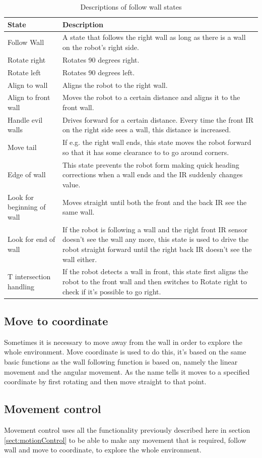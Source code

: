 \begin{table}[h!]
\centering
  \caption{Descriptions of follow wall states}
  \begin{tabular}{l|p{10cm}}
    \textbf{State} & \textbf{Description} \\ \hline
    Follow Wall & A state that follows the right wall as long as there is a wall on the robot’s right side. \\ \hline
    Rotate right & Rotates 90 degrees right. \\ \hline
    Rotate left & Rotates 90 degrees left. \\ \hline
    Align to wall & Aligns the robot to the right wall. \\ \hline
    Align to front wall & Moves the robot to a certain distance and aligns it to the front wall. \\ \hline
    Handle evil walls & Drives forward for a certain distance. Every time the front IR on the right side sees a wall, this distance is increased. \\ \hline
    Move tail & If e.g. the right wall ends, this state moves the robot forward so that it has some clearance to to go around corners. \\ \hline
    Edge of wall & This state prevents the robot form making quick heading corrections when a wall ends and the IR suddenly changes value. \\ \hline
    Look for beginning of wall & Moves straight until both the front and the back IR see the same wall.  \\ \hline
    Look for end of wall & If the robot is following a wall and the right front IR sensor doesn’t see the wall any more, this state is used to drive the robot straight forward until the right back IR doesn’t see the wall either. \\ \hline
    T intersection handling & If the robot detects a wall in front, this state first aligns the robot to the front wall and then switches to Rotate right to check if it’s possible to go right. \\ 
    \hline
  \end{tabular}
\normalsize
\label{tab:followWallStates}
\end{table}

\subsection{Move to coordinate}
Sometimes it is necessary to move away from the wall in order to explore the whole environment. Move coordinate is used to do this, it’s based on the same basic functions as the wall following function is based on, namely the linear movement and the angular movement. As the name tells it moves to a specified coordinate by first rotating and then move straight to that point.

\subsection{Movement control}
Movement control uses all the functionality previously described here in section \ref{sect:motionControl} to be able to make any movement that is required, follow wall and move to coordinate, to explore the whole environment.